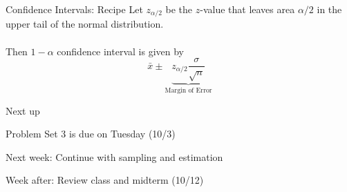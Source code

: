 \documentclass{./../div_teaching_slides}
\begin{document}
\begin{frame}{Confidence Intervals: Recipe}
Let $z_{\alpha/2}$ be the $z$-value that leaves area $\alpha/2$ in the upper tail of the normal distribution. \\~\\
Then $1-\alpha$ confidence interval is given by 
$$ \bar{x} \pm  \underbrace{z_{\alpha/2}  \frac{\sigma}{\sqrt{n}}}_{\text{Margin of Error}} $$
\end{frame}

\begin{frame}{Next up}
\begin{witemize}
  \item Problem Set 3 is due on Tuesday (10/3)
  \item Next week: Continue with sampling and estimation
  \item Week after: Review class and midterm (10/12)
\end{witemize}
\end{frame}
\end{document}
